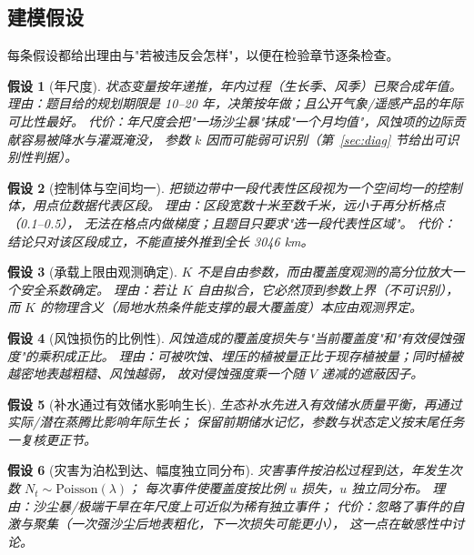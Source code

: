 \documentclass[11pt,a4paper]{ctexart}
\newtheorem{assumption}{假设}
\begin{document}
\subsection{建模假设}

每条假设都给出理由与"若被违反会怎样"，以便在检验章节逐条检查。

\begin{assumption}[年尺度]\label{as:year}
状态变量按年递推，年内过程（生长季、风季）已聚合成年值。
\emph{理由}：题目给的规划期限是 10--20 年，决策按年做；且公开气象/遥感产品的年际可比性最好。
\emph{代价}：年尺度会把"一场沙尘暴"抹成"一个月均值"，风蚀项的边际贡献容易被降水与灌溉淹没，
参数 $k$ 因而可能弱可识别（第~\ref{sec:diag} 节给出可识别性判据）。
\end{assumption}

\begin{assumption}[控制体与空间均一]\label{as:box}
把锁边带中一段代表性区段视为一个空间均一的控制体，用点位数据代表区段。
\emph{理由}：区段宽数十米至数千米，远小于再分析格点（0.1\textdegree--0.5\textdegree），
无法在格点内做梯度；且题目只要求"选一段代表性区域"。
\emph{代价}：结论只对该区段成立，不能直接外推到全长 3046 km。
\end{assumption}

\begin{assumption}[承载上限由观测确定]\label{as:K}
$K$ 不是自由参数，而由覆盖度观测的高分位放大一个安全系数确定。
\emph{理由}：若让 $K$ 自由拟合，它必然顶到参数上界（不可识别），
而 $K$ 的物理含义（局地水热条件能支撑的最大覆盖度）本应由观测界定。
\end{assumption}

\begin{assumption}[风蚀损伤的比例性]\label{as:erosion}
风蚀造成的覆盖度损失与"当前覆盖度"和"有效侵蚀强度"的乘积成正比。
\emph{理由}：可被吹蚀、埋压的植被量正比于现存植被量；同时植被越密地表越粗糙、风蚀越弱，
故对侵蚀强度乘一个随 $V$ 递减的遮蔽因子。
\end{assumption}

\begin{assumption}[补水通过有效储水影响生长]\label{as:water}
生态补水先进入有效储水质量平衡，再通过实际/潜在蒸腾比影响年际生长；
保留前期储水记忆，参数与状态定义按末尾任务一复核更正节。
\end{assumption}

\begin{assumption}[灾害为泊松到达、幅度独立同分布]\label{as:poisson}
灾害事件按泊松过程到达，年发生次数 $N_t\sim\mathrm{Poisson}(\lambda)$；
每次事件使覆盖度按比例 $u$ 损失，$u$ 独立同分布。
\emph{理由}：沙尘暴/极端干旱在年尺度上可近似为稀有独立事件；
\emph{代价}：忽略了事件的自激与聚集（一次强沙尘后地表粗化，下一次损失可能更小），
这一点在敏感性中讨论。
\end{assumption}
\end{document}
